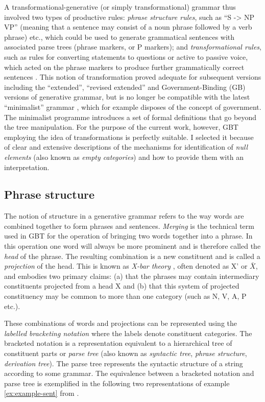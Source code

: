     A transformational-generative (or simply transformational) grammar thus involved two types of productive rules: \textit{phrase structure rules}, such as ``S -> NP VP'' (meaning that a sentence may consist of a noun phrase followed by a verb phrase) etc., which could be used to generate grammatical sentences with associated parse trees (phrase markers, or P markers); and \textit{transformational rules}, such as rules for converting statements to questions or active to passive voice, which acted on the phrase markers to produce further grammatically correct sentences \citep[59-66]{Bach1966}. This notion of transformation proved adequate for subsequent versions including the ``extended'', ``revised extended'' and Government-Binding (GB) versions of generative grammar, but is no longer be compatible with the latest ``minimalist'' grammar \citep{Chomsky93}, which for example disposes of the concept of government. The minimalist programme introduces a set of formal definitions that go beyond the tree manipulation. For the purpose of the current work, however, GBT employing the idea of transformations is perfectly suitable. I selected it because of clear and extensive descriptions of the mechanisms for identification of \textit{null elements} (also known as \textit{empty categories}) and how to provide them with an interpretation. 

\subsection{Phrase structure}
    The notion of structure in a generative grammar refers to the way words are combined together to form phrases and sentences. \textit{Merging} is the technical term used in GBT for the operation of bringing two words together into a phrase. In this operation one word will always be more prominent and is therefore called the \textit{head} of the phrase. The resulting combination is a new constituent and is called a \textit{projection} of the head. This is known as \textit{X-bar theory} \citep{Jackendoff77-book}, often denoted as X' or $\bar{X}$, and embodies two primary claims: (a) that the phrases may contain intermediary constituents projected from a head X and (b) that this system of projected constituency may be common to more than one category (such as N, V, A, P etc.).

    These combinations of words and projections can be represented using the \textit{labelled bracketing notation} where the labels denote constituent categories. The bracketed notation is a representation equivalent to a hierarchical tree of constituent parts or \textit{parse tree} (also known as \textit{syntactic tree}, \textit{phrase structure}, \textit{derivation tree}). The parse tree represents the syntactic structure of a string according to some grammar. The equivalence between a bracketed notation and parse tree is exemplified in the following two representations of example \ref{ex:example-sent} from \citep[83]{Haegeman1991}.

